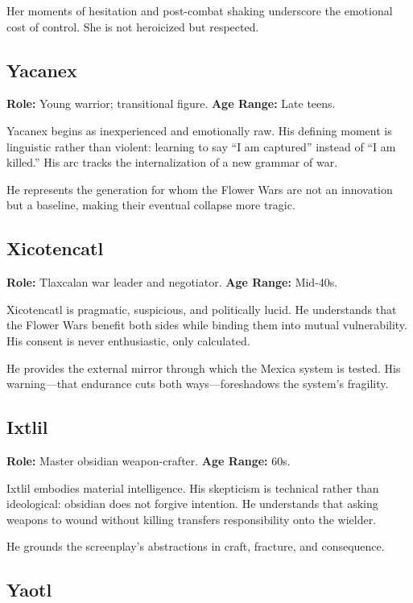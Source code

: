 \documentclass[12pt]{article}
\begin{document}
Her moments of hesitation and post-combat shaking underscore the emotional cost of control. She is not heroicized but respected.

\subsection*{Yacanex}

\textbf{Role:} Young warrior; transitional figure.  
\textbf{Age Range:} Late teens.

Yacanex begins as inexperienced and emotionally raw. His defining moment is linguistic rather than violent: learning to say “I am captured” instead of “I am killed.” His arc tracks the internalization of a new grammar of war.

He represents the generation for whom the Flower Wars are not an innovation but a baseline, making their eventual collapse more tragic.

\subsection*{Xicotencatl}

\textbf{Role:} Tlaxcalan war leader and negotiator.  
\textbf{Age Range:} Mid-40s.

Xicotencatl is pragmatic, suspicious, and politically lucid. He understands that the Flower Wars benefit both sides while binding them into mutual vulnerability. His consent is never enthusiastic, only calculated.

He provides the external mirror through which the Mexica system is tested. His warning—that endurance cuts both ways—foreshadows the system's fragility.

\subsection*{Ixtlil}

\textbf{Role:} Master obsidian weapon-crafter.  
\textbf{Age Range:} 60s.

Ixtlil embodies material intelligence. His skepticism is technical rather than ideological: obsidian does not forgive intention. He understands that asking weapons to wound without killing transfers responsibility onto the wielder.

He grounds the screenplay's abstractions in craft, fracture, and consequence.

\subsection*{Yaotl}
\end{document}
